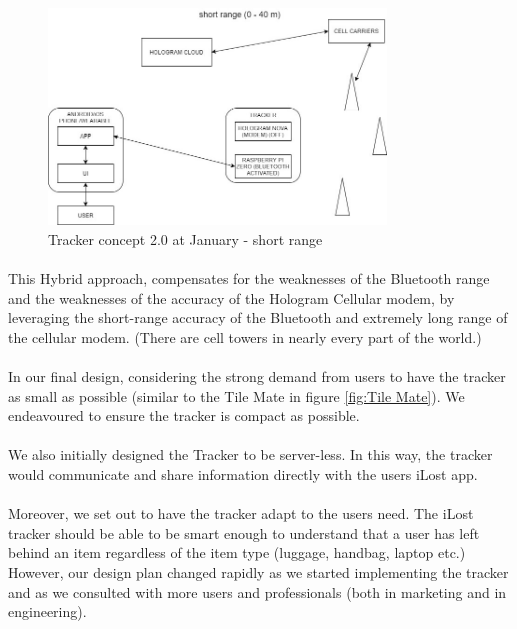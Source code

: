 \documentclass[12pt,a4paper]{article}
\begin{document}
        \begin{figure}[H]
          \centering
          \includegraphics[width=0.8\textwidth]{../assets/design-concept-v20-short-range.jpg}
          \caption{Tracker concept 2.0 at January - short range}
          \label{fig:Tracker concept at January - short range}
        \end{figure}
        
        \paragraph{} This Hybrid approach, compensates for the weaknesses of the Bluetooth range and the weaknesses of the accuracy of the Hologram Cellular modem, by leveraging the short-range accuracy of the Bluetooth and extremely long range of the cellular modem. (There are cell towers in nearly every part of the world.)
        
        \paragraph{} In our final design, considering the strong demand from users to have the tracker as small as possible (similar to the Tile Mate in figure \ref{fig:Tile Mate}). We endeavoured to ensure the tracker is compact as possible.
        
        \paragraph{} We also initially designed the Tracker to be server-less. In this way, the tracker would communicate and share information directly with the users iLost app.
        
        \paragraph{} Moreover, we set out to have the tracker adapt to the users need. The iLost tracker should be able to be smart enough to understand that a user has left behind an item regardless of the item type (luggage, handbag, laptop etc.) However, our design plan changed rapidly as we started implementing the tracker and as we consulted with more users and professionals (both in marketing and in engineering).
        
\end{document}
